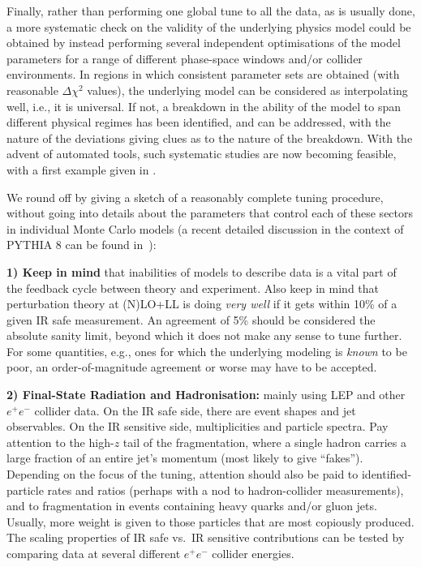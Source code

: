 Finally, rather than performing one global tune to all the
data, as is usually done,  a more systematic check on the validity of
the underlying physics model could be obtained by instead performing
several independent 
optimisations of the model parameters for a range of different 
phase-space windows and/or collider environments.
In regions in which consistent parameter sets are obtained (with
reasonable $\Delta\chi^2$ values), 
the underlying 
model can be considered as interpolating well, i.e., it is universal. 
If not, a breakdown in the ability of the model to span different
physical regimes has been identified, and can be addressed, with the
nature of the deviations giving clues as to the nature of the breakdown. 
With the advent of automated tools,  
such systematic studies are now becoming feasible, with a first
example given in \cite{Schulz:2011qy}. 

%
%
We round off by giving a sketch of a reasonably complete tuning
procedure, without going into details about the parameters that
control each of these sectors in individual Monte Carlo models 
(a recent detailed discussion in the context of PYTHIA 8 can be found
in~\cite{Skands:2014pea}): 

{\bf 1) Keep in mind} that inabilities of models to
 describe data is a vital part of the feedback cycle between
 theory and experiment. Also keep in mind that
 perturbation theory at (N)LO+LL is doing \emph{very well} if it gets
 within 10\% of a given IR safe measurement. An agreement of 5\% should be
 considered the absolute sanity limit, beyond which it does not make
 any sense to tune further. For some quantities, e.g., ones for which
 the underlying modeling is \emph{known} to be poor, an order-of-magnitude
  agreement or worse may have to be accepted. 
 
%
\textbf{2) Final-State Radiation and Hadronisation:} 
 mainly using LEP and other $e^+e^-$ collider data. On the IR safe
 side, there are event shapes and jet observables. On the IR sensitive
 side, multiplicities and particle spectra. Pay attention to 
 the high-$z$ tail of the fragmentation,
 where a single hadron carries a large fraction of an entire jet's
 momentum (most likely to give ``fakes''). 
Depending on the focus of the tuning, attention should also
 be paid to identified-particle rates and ratios (perhaps with a nod
 to hadron-collider measurements), and to fragmentation
 in events containing heavy quarks and/or gluon jets. 
 Usually, more weight is given to
 those particles that are most copiously produced. The scaling
 properties of IR safe vs.\ IR sensitive contributions can be
 tested by comparing data at several different $e^+e^-$ collider
 energies.  
 
